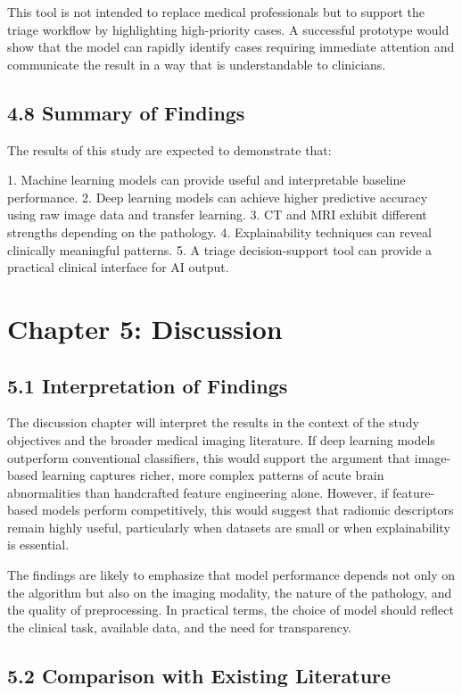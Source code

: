 \documentclass[12pt,a4paper]{report}
\begin{document}
This tool is not intended to replace medical professionals but to support the triage workflow by highlighting high-priority cases. A successful prototype would show that the model can rapidly identify cases requiring immediate attention and communicate the result in a way that is understandable to clinicians.

\section{4.8 Summary of Findings}

The results of this study are expected to demonstrate that:

1. Machine learning models can provide useful and interpretable baseline performance.
2. Deep learning models can achieve higher predictive accuracy using raw image data and transfer learning.
3. CT and MRI exhibit different strengths depending on the pathology.
4. Explainability techniques can reveal clinically meaningful patterns.
5. A triage decision-support tool can provide a practical clinical interface for AI output.


\chapter{Chapter 5: Discussion}

\section{5.1 Interpretation of Findings}

The discussion chapter will interpret the results in the context of the study objectives and the broader medical imaging literature. If deep learning models outperform conventional classifiers, this would support the argument that image-based learning captures richer, more complex patterns of acute brain abnormalities than handcrafted feature engineering alone. However, if feature-based models perform competitively, this would suggest that radiomic descriptors remain highly useful, particularly when datasets are small or when explainability is essential.

The findings are likely to emphasize that model performance depends not only on the algorithm but also on the imaging modality, the nature of the pathology, and the quality of preprocessing. In practical terms, the choice of model should reflect the clinical task, available data, and the need for transparency.

\section{5.2 Comparison with Existing Literature}
\end{document}
